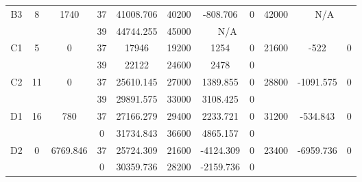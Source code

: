 \begin{sidewaystable}
\begin{tabular}{c||c|c||c|c|c|c|c||c|c|c}
         &
        
      \\
      \hline
      \multirow{2}{*}{B3} &
      \multirow{2}{*}{8} &
      \multirow{2}{*}{1740} &
      37 &
      41008.706 &
      40200 &
        -808.706 &
        0 &
      \multirow{2}{*}{42000} &
        \multicolumn{2}{c}{\multirow{2}{*}{N/A}}
      \\
      \cline{4-8}
       &
       &
       &
      39 &
      44744.255 &
      45000 &
        \multicolumn{2}{|c||}{N/A} &
      
        
      \\
      \hline
      \multirow{2}{*}{C1} &
      \multirow{2}{*}{5} &
      \multirow{2}{*}{0} &
      37 &
      17946 &
      19200 &
        1254 &
        0 &
      \multirow{2}{*}{21600} &
        \multirow{2}{*}{-522} &
        \multirow{2}{*}{0}
      \\
      \cline{4-8}
       &
       &
       &
      39 &
      22122 &
      24600 &
        2478 &
        0 &
      
         &
        
      \\
      \hline
      \multirow{2}{*}{C2} &
      \multirow{2}{*}{11} &
      \multirow{2}{*}{0} &
      37 &
      25610.145 &
      27000 &
        1389.855 &
        0 &
      \multirow{2}{*}{28800} &
        \multirow{2}{*}{-1091.575} &
        \multirow{2}{*}{0}
      \\
      \cline{4-8}
       &
       &
       &
      39 &
      29891.575 &
      33000 &
        3108.425 &
        0 &
      
         &
        
      \\
      \hline
      \multirow{2}{*}{D1} &
      \multirow{2}{*}{16} &
      \multirow{2}{*}{780} &
      37 &
      27166.279 &
      29400 &
        2233.721 &
        0 &
      \multirow{2}{*}{31200} &
        \multirow{2}{*}{-534.843} &
        \multirow{2}{*}{0}
      \\
      \cline{4-8}
       &
       &
       &
      0 &
      31734.843 &
      36600 &
        4865.157 &
        0 &
      
         &
        
      \\
      \hline
      \multirow{2}{*}{D2} &
      \multirow{2}{*}{0} &
      \multirow{2}{*}{6769.846} &
      37 &
      25724.309 &
      21600 &
        -4124.309 &
        0 &
      \multirow{2}{*}{23400} &
        \multirow{2}{*}{-6959.736} &
        \multirow{2}{*}{0}
      \\
      \cline{4-8}
       &
       &
       &
      0 &
      30359.736 &
      28200 &
        -2159.736 &
        0 &
      

\end{tabular}
\end{sidewaystable}
